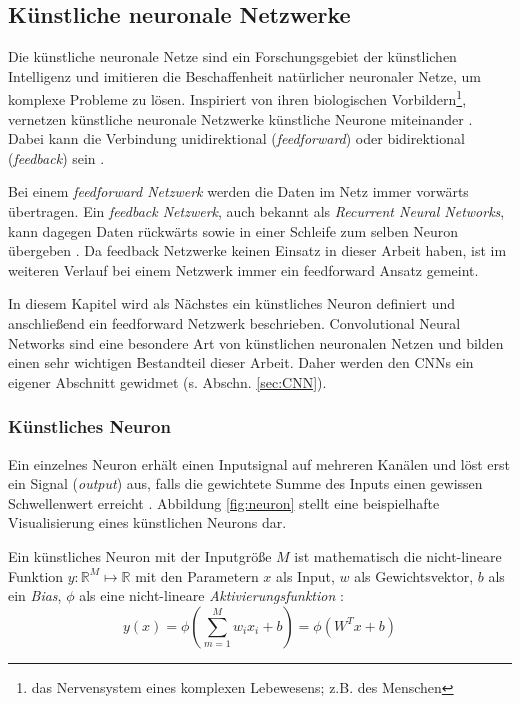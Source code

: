 \subsection{Künstliche neuronale Netzwerke}
\label{sec:KNN}
Die künstliche neuronale Netze sind ein Forschungsgebiet der künstlichen Intelligenz und imitieren die Beschaffenheit natürlicher neuronaler Netze, um komplexe Probleme zu lösen. Inspiriert von ihren biologischen Vorbildern\footnote{das Nervensystem eines komplexen Lebewesens; z.B. des Menschen}, vernetzen künstliche neuronale Netzwerke künstliche Neurone miteinander \cite{johnsonCS231nConvolutionalNeural}. Dabei kann die Verbindung unidirektional (\textit{feedforward}) oder bidirektional (\textit{feedback}) sein \cite{goodfellowDeepLearning2016}. 

Bei einem \textit{feedforward Netzwerk} werden die Daten im Netz immer vorwärts übertragen. Ein \textit{feedback Netzwerk}, auch bekannt als \textit{Recurrent Neural Networks}, kann dagegen Daten rückwärts sowie in einer Schleife zum selben Neuron übergeben \cite{goodfellowDeepLearning2016}. Da feedback Netzwerke keinen Einsatz in dieser Arbeit haben, ist im weiteren Verlauf bei einem Netzwerk immer ein feedforward Ansatz gemeint. 

In diesem Kapitel wird als Nächstes ein künstliches Neuron definiert und anschließend ein feedforward Netzwerk beschrieben. Convolutional Neural Networks sind eine besondere Art von künstlichen neuronalen Netzen und bilden einen sehr wichtigen Bestandteil dieser Arbeit. Daher werden den CNNs ein eigener Abschnitt gewidmet (s. Abschn. \ref{sec:CNN}).


\subsubsection{Künstliches Neuron}
Ein einzelnes Neuron erhält einen Inputsignal auf mehreren Kanälen und löst erst ein Signal (\textit{output}) aus, falls die gewichtete Summe des Inputs einen gewissen Schwellenwert erreicht \cite{johnsonCS231nConvolutionalNeural}. Abbildung \ref{fig:neuron} stellt eine beispielhafte Visualisierung eines künstlichen Neurons dar.

Ein künstliches Neuron mit der Inputgröße $M$ ist mathematisch die nicht-lineare Funktion $y : \mathbb{R}^M \mapsto \mathbb{R}$ mit den Parametern $x$ als Input, $w$ als Gewichtsvektor, $b$ als ein \textit{Bias}, $\phi$ als eine nicht-lineare \textit{Aktivierungsfunktion} \cite{johnsonCS231nConvolutionalNeural}:
\begin{equation}
	\label{eq:neuron}
	y(x)=\phi\left(\sum_{m=1}^{M} w_{i} x_{i} + b\right) = \phi(W^Tx+b)
\end{equation}


